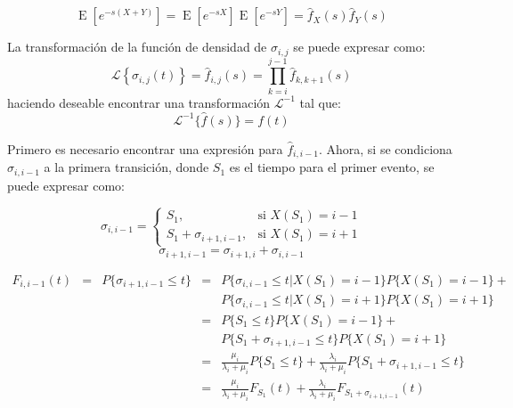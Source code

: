\documentclass[11pt]{article}
\numberwithin{equation}{section} %
\begin{document}
\begin{equation}
\operatorname{E}[e^{-s(X+Y)}]=\operatorname{E}[e^{-sX}]\operatorname{E}[e^{-sY}]=\hat{f}_{X}(s)\hat{f}_{Y}(s)
\end{equation}

La transformación de la función de densidad de $\sigma_{i,j}$ se puede expresar como:
\begin{equation} \label{eq:laplacesum}
\mathcal{L} \left\{\sigma_{i,j}(t)\right\}=\hat{f}_{i,j}(s)=\prod_{k=i}^{j-1}\hat{f}_{k,k+1}(s)
\end{equation}
haciendo deseable encontrar una transformación $\mathcal{L}^{-1}$ tal que:
\begin{equation}
\mathcal{L}^{-1}\{\hat{f}(s)\}=f(t)
\end{equation}

Primero es necesario encontrar una expresión para $\hat{f}_{i,i-1}$. Ahora, si se condiciona $\sigma_{i,i-1}$ a la primera transición, donde $S_1$ es el tiempo para el primer evento, se puede expresar como:

\begin{equation}
\sigma_{i,i-1} =
\begin{cases}
S_{1}, & \mbox{si } X(S_{1})=i-1 \\
S_{1}+\sigma_{i+1,i-1}, & \mbox{si } X(S_{1})=i+1
\end{cases}
\end{equation}
\begin{equation}
\sigma_{i+1,i-1}=\sigma_{i+1,i}+\sigma_{i,i-1}
\end{equation}
 
\[
\begin{array}{rcrcl}
F_{i,i-1}(t) & = & P\{ \sigma_{i+1,i-1}\leq t \} & = & P\{ \sigma_{i,i-1}\leq t | X(S_{1})=i-1 \}P\{ X(S_{1})=i-1 \} +\\
 & & & & P\{ \sigma_{i,i-1}\leq t | X(S_{1})=i+1 \}P\{ X(S_{1})=i+1 \} \\
 & & & = & P\{ S_{1}\leq t\}P\{ X(S_{1})=i-1 \} +\\
 & & & & P\{ S_{1} + \sigma_{i+1,i-1}\leq t\}P\{ X(S_{1})=i+1 \} \\
 & & & = & \frac{\mu_{i}}{\lambda_{i}+\mu_{i}} P\{ S_{1}\leq t\} + \frac{\lambda_{i}}{\lambda_{i}+\mu_{i}} P\{ S_{1} + \sigma_{i+1,i-1}\leq t\}\\
 & & & = & \frac{\mu_{i}}{\lambda_{i}+\mu_{i}} F_{S_{1}}(t) + \frac{\lambda_{i}}{\lambda_{i}+\mu_{i}} F_{ S_{1} + \sigma_{i+1,i-1}}(t)\\
\end{array}
\]
 
\end{document}
